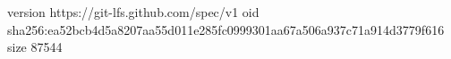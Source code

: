 version https://git-lfs.github.com/spec/v1
oid sha256:ea52bcb4d5a8207aa55d011e285fc0999301aa67a506a937c71a914d3779f616
size 87544
